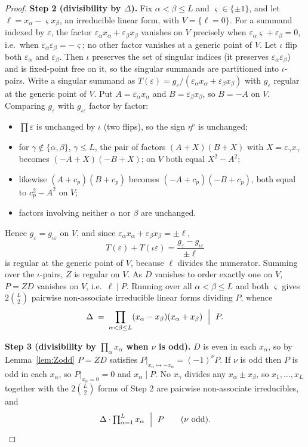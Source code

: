 \documentclass[11pt]{article}
\theoremstyle{definition}
\theoremstyle{remark}
\begin{document}
\begin{proof}
\smallskip\noindent\textbf{Step 2 (divisibility by $\Delta$).} Fix $\alpha<\beta\le L$
and $\varsigma\in\{\pm1\}$, and let $\ell=x_\alpha-\varsigma x_\beta$, an irreducible
linear form, with $V=\{\ell=0\}$. For a summand indexed by $\varepsilon$, the factor
$\varepsilon_\alpha x_\alpha+\varepsilon_\beta x_\beta$ vanishes on $V$ precisely when
$\varepsilon_\alpha\varsigma+\varepsilon_\beta=0$, i.e.\ when
$\varepsilon_\alpha\varepsilon_\beta=-\varsigma$; no other factor vanishes at a generic
point of $V$. Let $\iota$ flip both $\varepsilon_\alpha$ and $\varepsilon_\beta$. Then
$\iota$ preserves the set of singular indices (it preserves
$\varepsilon_\alpha\varepsilon_\beta$) and is fixed-point free on it, so the singular
summands are partitioned into $\iota$-pairs. Write a singular summand as
$T(\varepsilon)=g_\varepsilon/(\varepsilon_\alpha x_\alpha+\varepsilon_\beta x_\beta)$
with $g_\varepsilon$ regular at the generic point of $V$. Put
$A=\varepsilon_\alpha x_\alpha$ and $B=\varepsilon_\beta x_\beta$, so $B=-A$ on $V$.
Comparing $g_\varepsilon$ with $g_{\iota\varepsilon}$ factor by factor:
\begin{itemize}
\item $\prod\varepsilon$ is unchanged by $\iota$ (two flips), so the sign
      $\eta^{\nu}$ is unchanged;
\item for $\gamma\notin\{\alpha,\beta\}$, $\gamma\le L$, the pair of factors
      $(A+X)(B+X)$ with $X=\varepsilon_\gamma x_\gamma$ becomes $(-A+X)(-B+X)$; on $V$
      both equal $X^2-A^2$;
\item likewise $(A+c_p)(B+c_p)$ becomes $(-A+c_p)(-B+c_p)$, both equal to $c_p^2-A^2$
      on $V$;
\item factors involving neither $\alpha$ nor $\beta$ are unchanged.
\end{itemize}
Hence $g_\varepsilon=g_{\iota\varepsilon}$ on $V$, and since
$\varepsilon_\alpha x_\alpha+\varepsilon_\beta x_\beta=\pm\ell$,
\[
  T(\varepsilon)+T(\iota\varepsilon)
  =\frac{g_\varepsilon-g_{\iota\varepsilon}}{\pm\ell}
\]
is regular at the generic point of $V$, because $\ell$ divides the numerator. Summing
over the $\iota$-pairs, $Z$ is regular on $V$. As $D$ vanishes to order exactly one on
$V$, $P=ZD$ vanishes on $V$, i.e.\ $\ell\mid P$. Running over all $\alpha<\beta\le L$
and both $\varsigma$ gives $2\binom{L}{2}$ pairwise non-associate irreducible linear
forms dividing $P$, whence
\[
  \Delta\;=\;\prod_{\alpha<\beta\le L}(x_\alpha-x_\beta)(x_\alpha+x_\beta)\ \Bigm|\ P .
\]

\smallskip\noindent\textbf{Step 3 (divisibility by $\prod_\alpha x_\alpha$ when $\nu$
is odd).} $D$ is even in each $x_\alpha$, so by Lemma~\ref{lem:Zodd} $P=ZD$ satisfies
$P|_{x_\alpha\mapsto-x_\alpha}=(-1)^{\nu}P$. If $\nu$ is odd then $P$ is odd in each
$x_\alpha$, so $P|_{x_\alpha=0}=0$ and $x_\alpha\mid P$. No $x_\gamma$ divides any
$x_\alpha\pm x_\beta$, so $x_1,\dots,x_L$ together with the $2\binom L2$ forms of Step 2
are pairwise non-associate irreducibles, and
\[
  \Delta\cdot\textstyle\prod_{\alpha=1}^{L}x_\alpha\ \Bigm|\ P
  \qquad(\nu\ \text{odd}).
\]


\end{proof}
\end{document}
